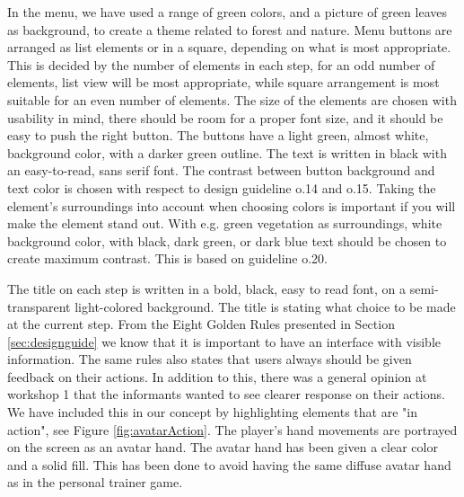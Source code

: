 In the menu, we have used a range of green colors, and a picture of green leaves as background, to create a theme related to forest and nature. Menu buttons are arranged as list elements or in a square, depending on what is most appropriate. This is decided by the number of elements in each step, for an odd number of elements, list view will be most appropriate, while square arrangement is most suitable for an even number of elements. The size of the elements are chosen with usability in mind, there should be room for a proper font size, and it should be easy to push the right button. The buttons have a light green, almost white, background color, with a darker green outline. The text is written in black with an easy-to-read, sans serif font. The contrast between button background and text color is chosen with respect to design guideline o.14 and o.15. Taking the element's surroundings into account when choosing colors is important if you will make the element stand out. With e.g. green vegetation as surroundings, white background color, with black, dark green, or dark blue text should be chosen to create maximum contrast. This is based on guideline o.20. 

The title on each step is written in a bold, black, easy to read font, on a semi-transparent light-colored background. The title is stating what choice to be made at the current step. From the Eight Golden Rules presented in Section \ref{sec:designguide} we know that it is important to have an interface with visible information. The same rules also states that users always should be given feedback on their actions. In addition to this, there was a general opinion at workshop 1 that the informants wanted to see clearer response on their actions. We have included this in our concept by highlighting elements that are "in action", see Figure \ref{fig:avatarAction}. The player's hand movements are portrayed on the screen as an avatar hand. The avatar hand has been given a clear color and a solid fill. This has been done to avoid having the same diffuse avatar hand as in the personal trainer game.  

